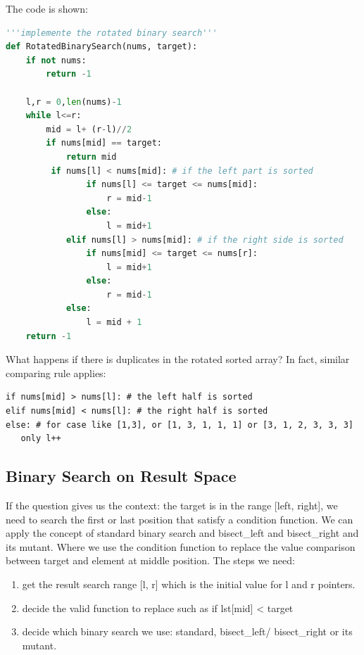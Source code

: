 \documentclass[../searching.tex]{subfiles}
\begin{document}
The code is shown:
\begin{lstlisting}[language=Python]
'''implemente the rotated binary search'''
def RotatedBinarySearch(nums, target):
    if not nums:
        return -1
   
    l,r = 0,len(nums)-1
    while l<=r:
        mid = l+ (r-l)//2
        if nums[mid] == target:
            return mid
         if nums[l] < nums[mid]: # if the left part is sorted
                if nums[l] <= target <= nums[mid]:
                    r = mid-1
                else:
                    l = mid+1
            elif nums[l] > nums[mid]: # if the right side is sorted
                if nums[mid] <= target <= nums[r]:
                    l = mid+1
                else:
                    r = mid-1
            else:
                l = mid + 1
    return -1
\end{lstlisting}
\begin{bclogo}[couleur = blue!30, arrondi=0.1,logo=\bccrayon,ombre=true]{What happens if there is duplicates in the rotated sorted array? } In fact, similar comparing rule applies: 
\begin{lstlisting}[numbers=none]
if nums[mid] > nums[l]: # the left half is sorted
elif nums[mid] < nums[l]: # the right half is sorted
else: # for case like [1,3], or [1, 3, 1, 1, 1] or [3, 1, 2, 3, 3, 3]
   only l++
\end{lstlisting}
\end{bclogo}




\subsection{Binary Search on Result Space}
If the question gives us the context: the target is in the range [left, right], we need to search the first or last position that satisfy a condition function. We can apply the concept of standard binary search and bisect\_left and bisect\_right and its mutant. Where we use the condition function to replace the value comparison between target and element at middle position. The steps we need:
\begin{enumerate}
    \item get the result search range [l, r] which is the initial value for l and r pointers. 
    \item decide the valid function to replace such as if lst[mid] < target 
    \item decide which binary search we use: standard, bisect\_left/ bisect\_right or its mutant.
\end{enumerate}
\end{document}
